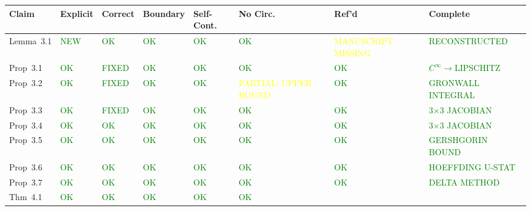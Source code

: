
\small
\begin{tabular}{lp{1.5cm}p{1.5cm}p{1.5cm}p{1.5cm}p{1.5cm}p{1.5cm}p{1.6cm}}
\toprule
\textbf{Claim} & \textbf{Explicit} & \textbf{Correct} & \textbf{Boundary} & \textbf{Self-Cont.} & \textbf{No Circ.} & \textbf{Ref'd} & \textbf{Complete} \\
\midrule
Lemma~3.1 &
\textcolor{green}{NEW} &
\textcolor{green}{OK} &
\textcolor{green}{OK} &
\textcolor{green}{OK} &
\textcolor{green}{OK} &
\textcolor{yellow}{MANUSCRIPT MISSING} &
\textcolor{green}{RECONSTRUCTED} \\
Prop~3.1 &
\textcolor{green}{OK} &
\textcolor{green}{FIXED} &
\textcolor{green}{OK} &
\textcolor{green}{OK} &
\textcolor{green}{OK} &
\textcolor{green}{OK} &
\textcolor{green}{$C^\infty$$\to$LIPSCHITZ} \\
Prop~3.2 &
\textcolor{green}{OK} &
\textcolor{green}{FIXED} &
\textcolor{green}{OK} &
\textcolor{green}{OK} &
\textcolor{yellow}{PARTIAL: UPPER BOUND} &
\textcolor{green}{OK} &
\textcolor{green}{GRONWALL INTEGRAL} \\
Prop~3.3 &
\textcolor{green}{OK} &
\textcolor{green}{FIXED} &
\textcolor{green}{OK} &
\textcolor{green}{OK} &
\textcolor{green}{OK} &
\textcolor{green}{OK} &
\textcolor{green}{3$\times$3 JACOBIAN} \\
Prop~3.4 &
\textcolor{green}{OK} &
\textcolor{green}{OK} &
\textcolor{green}{OK} &
\textcolor{green}{OK} &
\textcolor{green}{OK} &
\textcolor{green}{OK} &
\textcolor{green}{3$\times$3 JACOBIAN} \\
Prop~3.5 &
\textcolor{green}{OK} &
\textcolor{green}{OK} &
\textcolor{green}{OK} &
\textcolor{green}{OK} &
\textcolor{green}{OK} &
\textcolor{green}{OK} &
\textcolor{green}{GERSHGORIN BOUND} \\
Prop~3.6 &
\textcolor{green}{OK} &
\textcolor{green}{OK} &
\textcolor{green}{OK} &
\textcolor{green}{OK} &
\textcolor{green}{OK} &
\textcolor{green}{OK} &
\textcolor{green}{HOEFFDING U-STAT} \\
Prop~3.7 &
\textcolor{green}{OK} &
\textcolor{green}{OK} &
\textcolor{green}{OK} &
\textcolor{green}{OK} &
\textcolor{green}{OK} &
\textcolor{green}{OK} &
\textcolor{green}{DELTA METHOD} \\
Thm~4.1 &
\textcolor{green}{OK} &
\textcolor{green}{OK} &
\textcolor{green}{OK} &
\textcolor{green}{OK} &
\textcolor{green}{OK} &

\end{tabular}
